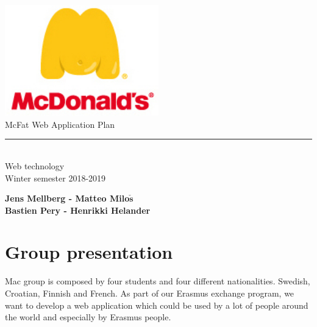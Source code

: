 \documentclass[12pt]{article}
\begin{document}
\begin{titlepage}
        \begin{center}
            \includegraphics[width=0.5\textwidth]{./Pictures/mcdonalds-fat-logo.jpg}\\
            \vspace{1cm}
            \Large McFat Web Application Plan\\
            \rule{5cm}{.5pt}\\
            \vspace{0.6cm}
            {\Large Web technology}\\
            \vspace{0.1cm}
            {\Large Winter semester 2018-2019} \\
            \vspace{3em}

            \textbf{Jens Mellberg - Matteo Milo$\mathbf{\check{s}}$}\\
            \textbf{Bastien Pery - Henrikki Helander}
        \end{center}

    \end{titlepage}

    \renewcommand{\contentsname}{\color{color_section}\\Table of contents}
    \tableofcontents

    \newpage

    {\color{color_section}\section{Group presentation}}
        Mac group is composed by four students and four different nationalities.
        Swedish, Croatian, Finnish and French. As part of our Erasmus exchange program, 
        we want to develop a web application which could be used by a lot 
        of people around the world and especially by Erasmus people.
        
\end{document}
